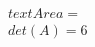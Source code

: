 \documentclass[preview]{standalone}
\begin{document}
\begin{align*}
\quad\\text{Area} = \quad\\det(A) = 6
\end{align*}
\end{document}
